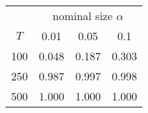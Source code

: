 % 
\begin{tabular}{cccc}
  \hline
  & \multicolumn{3}{c}{nominal size $\alpha$} \\
 $T$ & 0.01 & 0.05 & 0.1 \\
 \hline
100 & 0.048 & 0.187 & 0.303 \\ 
  250 & 0.987 & 0.997 & 0.998 \\ 
  500 & 1.000 & 1.000 & 1.000 \\ 
   \hline
\end{tabular}

